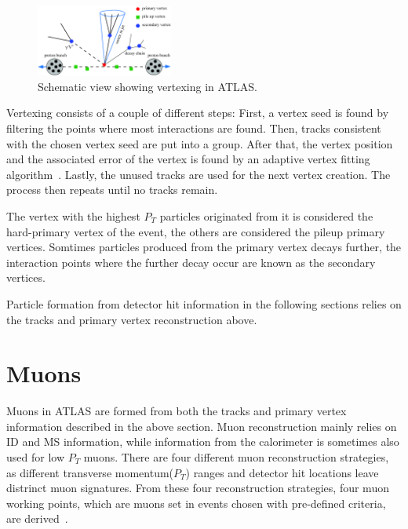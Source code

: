 \begin{figure}[!htb]
    \begin{center}
        \includegraphics[width=0.4\textwidth]{figures/common_ana/Vertex}
        \caption{        
            Schematic view showing vertexing in ATLAS\cite{4774734}.
        }
    \end{center}
\end{figure}

Vertexing consists of a couple of different steps: First, a vertex seed is found by filtering the points where most interactions are found. Then, tracks consistent with the chosen vertex seed are put into a group. After that, the vertex position and the associated error of the vertex is found by an adaptive vertex fitting algorithm~\cite{track}. Lastly, the unused tracks are used for the next vertex creation. The process then repeats until no tracks remain. 

The vertex with the highest $P_{T}$ particles originated from it is considered the hard-primary vertex of the event, the others are considered the pileup primary vertices. Somtimes particles produced from the primary vertex decays further, the interaction points where the further decay occur are known as the secondary vertices.

Particle formation from detector hit information in the following sections relies on the tracks and primary vertex reconstruction above.

\section{Muons}
\label{sec:Muon}
Muons in ATLAS are formed from both the tracks and primary vertex information described in the above section. Muon reconstruction mainly relies on ID and MS information, while information from the calorimeter is sometimes also used for low $P_{T}$ muons. There are four different muon reconstruction strategies, as different transverse momentum($P_{T}$) ranges and detector hit locations leave distrinct muon signatures. From these four reconstruction strategies, four muon
working points, which are muons set in events chosen with pre-defined criteria, are derived~\cite{Aad:2746302}.

